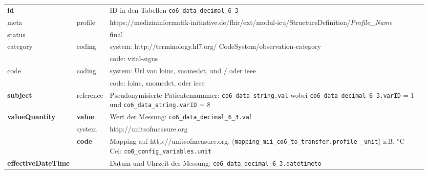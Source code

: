 \begin{longtable}{|l|l|p{7.5cm}|} 
	\hline
	\rowcolor{lightgray} \multicolumn{3}{|l|}{Data Mapping (inhaltlich) - nummerische Werte} \\ \hline
	\textbf{id} &  & ID in den Tabellen \texttt{co6\_data\_decimal\_6\_3} \\ \hline
	meta & profile & https://medizininformatik-initiative.de/fhir/ext/modul-icu/StructureDefinition/\textsl{Profile\_Name} \\ \hline 
	status &  & final  \\ \hline 
	category & coding & system: http://terminology.hl7.org/ CodeSystem/observation-category \\ 
	\cline{3-3}
	& & code: vital-signs \\ \hline
	code & coding & system: Url von \ac{loinc}, \ac{snomedct}, und / oder \ac{ieee} \\ 
	\cline{3-3} 
	 &  & code: \ac{loinc}, \ac{snomedct}, oder \ac{ieee} \\ \hline
	\textbf{subject} & reference & Pseudonymisierte Patientennummer: \texttt{co6\_data\_string.val} wobei \texttt{co6\_data\_decimal\_6\_3.varID} = 1 und \texttt{co6\_data\_string.varID} = 8 \\ \hline
	\textbf{valueQuantity} & \textbf{value} & Wert der Messung: \texttt{co6\_data\_decimal\_6\_3.val} \\
	\cline{2-3}
	 & system & http://unitsofmeasure.org \\ 
	 \cline{2-3}
	 & \textbf{code} & Mapping auf http://unitsofmeasure.org. (\texttt{mapping\_mii\_co6\_to\_transfer.profile \_unit}) z.B. °C - Cel: \texttt{co6\_config\_variables.unit} \\ \hline
    \textbf{effectiveDateTime} & & Datum und Uhrzeit der Messung: \texttt{co6\_data\_decimal\_6\_3.datetimeto}  \\ \hline
\end{longtable}

\vspace{4mm}

